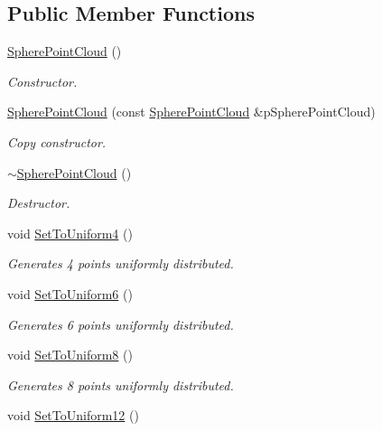 \subsection*{Public Member Functions}
\begin{DoxyCompactItemize}
\item 
\hyperlink{class_sphere_point_cloud_a2b7e0b5989a455ec7986d9d536f3ce21}{Sphere\+Point\+Cloud} ()
\begin{DoxyCompactList}\small\item\em Constructor. \end{DoxyCompactList}\item 
\hyperlink{class_sphere_point_cloud_ac1d6c155589d2a2c5e1344461237370e}{Sphere\+Point\+Cloud} (const \hyperlink{class_sphere_point_cloud}{Sphere\+Point\+Cloud} \&p\+Sphere\+Point\+Cloud)
\begin{DoxyCompactList}\small\item\em Copy constructor. \end{DoxyCompactList}\item 
\hyperlink{class_sphere_point_cloud_a0257f3ce5bdc5ddd24bbb49c21d8a9f5}{$\sim$\+Sphere\+Point\+Cloud} ()
\begin{DoxyCompactList}\small\item\em Destructor. \end{DoxyCompactList}\item 
void \hyperlink{class_sphere_point_cloud_a2653050cf6623de85dc67427b3a4145f}{Set\+To\+Uniform4} ()
\begin{DoxyCompactList}\small\item\em Generates 4 points uniformly distributed. \end{DoxyCompactList}\item 
void \hyperlink{class_sphere_point_cloud_a3ec027baeb8148420e9429beeb0f9083}{Set\+To\+Uniform6} ()
\begin{DoxyCompactList}\small\item\em Generates 6 points uniformly distributed. \end{DoxyCompactList}\item 
void \hyperlink{class_sphere_point_cloud_accc06313864eaa198971ef0108bcb3ca}{Set\+To\+Uniform8} ()
\begin{DoxyCompactList}\small\item\em Generates 8 points uniformly distributed. \end{DoxyCompactList}\item 
void \hyperlink{class_sphere_point_cloud_a91f91589cc74911158165b6adf46b428}{Set\+To\+Uniform12} ()

\end{DoxyCompactItemize}
